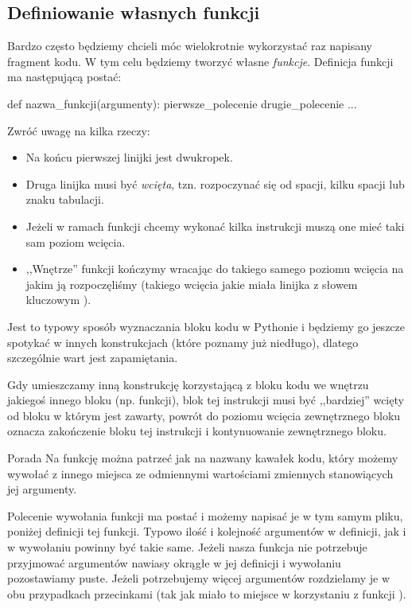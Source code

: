 \subsection{Definiowanie własnych funkcji}

Bardzo często będziemy chcieli móc wielokrotnie wykorzystać raz napisany fragment kodu.
W tym celu będziemy tworzyć własne \emph{funkcje}. Definicja funkcji ma następującą postać:

\begin{CodeFrame*}[python]{}
def nazwa_funkcji(argumenty):
  pierwsze_polecenie
  drugie_polecenie
  ...
\end{CodeFrame*}

\noindent
Zwróć uwagę na kilka rzeczy:
\begin{itemize}
	\item Na końcu pierwszej linijki jest dwukropek.
	\item Druga linijka musi być \emph{wcięta}, tzn. rozpoczynać się od spacji, kilku spacji lub znaku tabulacji.
	\item Jeżeli w ramach funkcji chcemy wykonać kilka instrukcji muszą one mieć taki sam poziom wcięcia.
	\item ,,Wnętrze'' funkcji kończymy wracając do takiego samego poziomu wcięcia na jakim ją rozpoczęliśmy
	      (takiego wcięcia jakie miała linijka z słowem kluczowym ).
\end{itemize}\vspace{-4pt}
Jest to typowy sposób wyznaczania bloku kodu w Pythonie i będziemy go jeszcze spotykać w innych konstrukcjach (które poznamy już niedługo), dlatego szczególnie wart jest zapamiętania.

Gdy umieszczamy inną konstrukcję korzystającą z bloku kodu we wnętrzu jakiegoś innego bloku (np. funkcji), blok tej instrukcji musi być ,,bardziej'' wcięty od bloku w którym jest zawarty,
powrót do poziomu wcięcia zewnętrznego bloku oznacza zakończenie bloku tej instrukcji i kontynuowanie zewnętrznego bloku.

\begin{ProTip}{Porada}
Na funkcję można patrzeć jak na nazwany kawałek kodu, który możemy wywołać z innego miejsca ze odmiennymi wartościami zmiennych stanowiących jej argumenty.
\end{ProTip}

Polecenie wywołania funkcji ma postać  i możemy napisać je w tym samym pliku, poniżej definicji tej funkcji.
Typowo ilość i kolejność argumentów w definicji, jak i w wywołaniu powinny być takie same.
Jeżeli nasza funkcja nie potrzebuje przyjmować argumentów nawiasy okrągłe w jej definicji i wywołaniu pozostawiamy puste.
Jeżeli potrzebujemy więcej argumentów rozdzielamy je w obu przypadkach przecinkami (tak jak miało to miejsce w korzystaniu z funkcji ).

